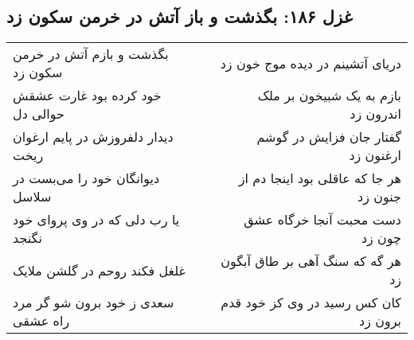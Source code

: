 \begin{center}
\section*{غزل ۱۸۶: بگذشت و باز آتش در خرمن سکون زد}
\label{sec:186}
\begin{longtable}{l p{0.5cm} r}
بگذشت و بازم آتش در خرمن سکون زد
&&
دریای آتشینم در دیده موج خون زد
\\
خود کرده بود غارت عشقش حوالی دل
&&
بازم به یک شبیخون بر ملک اندرون زد
\\
دیدار دلفروزش در پایم ارغوان ریخت
&&
گفتار جان فزایش در گوشم ارغنون زد
\\
دیوانگان خود را می‌بست در سلاسل
&&
هر جا که عاقلی بود اینجا دم از جنون زد
\\
یا رب دلی که در وی پروای خود نگنجد
&&
دست محبت آنجا خرگاه عشق چون زد
\\
غلغل فکند روحم در گلشن ملایک
&&
هر گه که سنگ آهی بر طاق آبگون زد
\\
سعدی ز خود برون شو گر مرد راه عشقی
&&
کان کس رسید در وی کز خود قدم برون زد
\\
\end{longtable}
\end{center}
